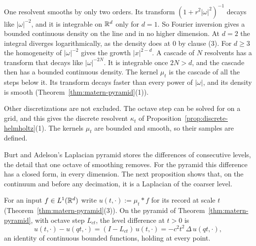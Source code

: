One resolvent smooths by only two orders. Its transform $(1 + r^2|\omega|^2)^{-1}$ decays like
$|\omega|^{-2}$, and it is integrable on $\mathbb{R}^d$ only for $d = 1$. So Fourier inversion gives a
bounded continuous density on the line and in no higher dimension. At $d = 2$ the integral diverges logarithmically, as
the density does at $0$ by clause (3). For $d \ge 3$ the homogeneity of $|\omega|^{-2}$ gives the
growth $|x|^{2-d}$. A cascade of $N$ resolvents has a transform that decays like $|\omega|^{-2N}$.
It is integrable once $2N > d$, and the cascade then has a bounded continuous density. The kernel
$\mu_t$ is the cascade of all the steps below it. Its transform decays faster than every power of
$|\omega|$, and its density is smooth (Theorem~\ref{thm:matern-pyramid}(1)).

Other discretizations are not excluded. The octave step can be solved for on a grid, and this gives
the discrete resolvent $\kappa_t$ of Proposition~\ref{prop:discrete-helmholtz}(1). The kernels
$\mu_t$ are bounded and smooth, so their samples are defined.

Burt and Adelson's Laplacian pyramid stores the differences of consecutive levels, the detail that
one octave of smoothing removes. For the \Matern{} pyramid this difference has a closed form, in
every dimension. The next proposition shows that, on the
continuum and before any decimation, it is a Laplacian of the coarser level.

\begin{proposition}
\label{prop:laplacian-pyramid}

For an input $f \in L^1(\mathbb{R}^d)$ write $u(t, \cdot) := \mu_t * f$ for its record at scale $t$
(Theorem~\ref{thm:matern-pyramid}(3)).
On the \Matern{} pyramid of Theorem~\ref{thm:matern-pyramid}, with octave step $L_{ct}$, the level
difference at $t > 0$ is
\[
  u(t, \cdot) - u(qt, \cdot) = (I - L_{ct})\,u(t, \cdot) = -c^2t^2\,\Delta\,u(qt, \cdot) ,
\]
an identity of continuous bounded functions, holding at every point.
\end{proposition}

